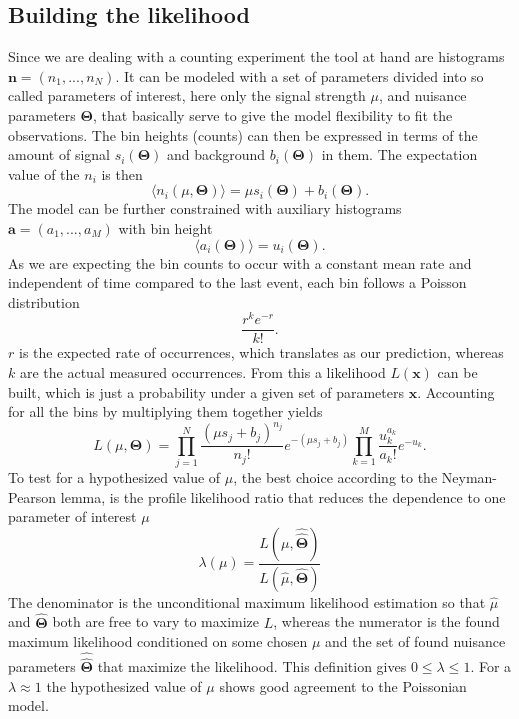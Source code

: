 \subsection{Building the likelihood}
Since we are dealing with a counting experiment the tool at hand are histograms $\bm{n}=(n_1,...,n_N)$. It can be modeled with a set of parameters divided into so called parameters of interest, here only the signal strength $\mu$, and nuisance parameters $\bm{\Theta}$, that basically serve to give the model flexibility to fit the observations. The bin heights (counts) can then be expressed in terms of the amount of signal $s_i(\bm{\Theta})$ and background $b_i(\bm{\Theta})$ in them. The expectation value of the $n_i$ is then
\begin{equation} \label{eq:n_i}
    \langle n_i(\mu,\bm{\Theta})\rangle = \mu s_i(\bm{\Theta}) +b_i(\bm{\Theta}).
\end{equation}
The model can be further constrained with auxiliary histograms $\bm{a}=(a_1,...,a_M)$ with bin height
\begin{equation} \label{eq:a_i}
    \langle a_i(\bm{\Theta}) \rangle = u_i(\bm{\Theta}).
\end{equation}
As we are expecting the bin counts to occur with a constant mean rate and independent of time compared to the last event, each bin follows a Poisson distribution
\begin{equation}\label{eq:poisson}
    \frac{r^k e^{-r}}{k!}.
\end{equation}
$r$ is the expected rate of occurrences, which translates as our prediction, whereas $k$ are the actual measured occurrences. From this a likelihood $L(\bm{x})$ can be built, which is just a probability under a given set of parameters $\bm{x}$. Accounting for all the bins by multiplying them together yields
\begin{equation}
    L(\mu,\bm{\Theta})=
    \prod_{j=1}^N \frac{(\mu s_j + b_j)^{n_j}}{n_j !} e^{-(\mu s_j + b_j)}
    \prod_{k=1}^M \frac{u_k^{a_k}}{a_k!} e^{-u_k}.
\end{equation}
To test for a hypothesized value of $\mu$, the best choice according to the Neyman-Pearson lemma, is the profile likelihood ratio that reduces the dependence to one parameter of interest $\mu$
\begin{equation}
\lambda(\mu)=
    \frac{L(\mu,\hat{\hat{\bm{\Theta}}})}
    {L(\hat{\mu},\hat{\bm{\Theta}})}
\end{equation}
The denominator is the unconditional maximum likelihood estimation so that $\hat{\mu}$ and $\hat{\bm{\Theta}}$ both are free to vary to maximize $L$, whereas the numerator is the found maximum likelihood conditioned on some chosen $\mu$ and the set of found nuisance parameters $\hat{\hat{\bm{\Theta}}}$ that maximize the likelihood. This definition gives $0 \leq \lambda \leq 1$. For a $\lambda \approx 1$ the hypothesized value of $\mu$ shows good agreement to the Poissonian model.

